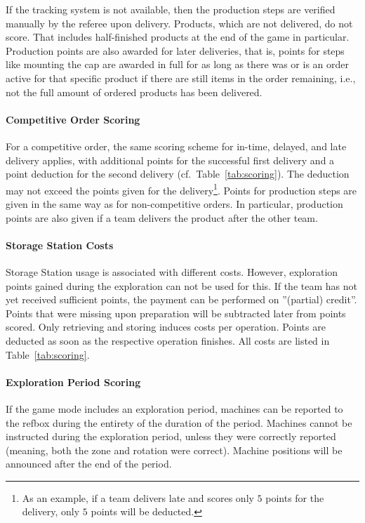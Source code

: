 \documentclass[12pt,twoside]{article}
\newcommand{\reftab}[1]{Table~\ref{#1}}
\begin{document}
If the tracking system is not available, then the production steps are
verified manually by the referee upon delivery.
Products, which are not delivered, do not score. That includes half-finished
products at the end of the game in particular. Production points are
also awarded for later deliveries, that is, points for steps like
mounting the cap are awarded in full for as long as there was or is
an order active for that specific product if there are still items
in the order remaining, i.e., not the full amount of ordered products
has been delivered.
%

\paragraph{Competitive Order Scoring}
For a competitive order, the same scoring scheme for in-time, delayed, and late
delivery applies, with additional points for the successful first delivery and a
point deduction for the second delivery (cf.~\reftab{tab:scoring}). The
deduction may not exceed the points given for the delivery\footnote{As an
example, if a team delivers late and scores only $5$ points for the delivery,
only $5$ points will be deducted.}. Points for production steps are given in the
same way as for non-competitive orders. In particular, production points are
also given if a team delivers the product after the other team.

\paragraph{Storage Station Costs}
Storage Station usage is associated with different costs.
However, exploration points gained during the exploration can not be
used for this. If the team has not yet received sufficient points,
the payment can be performed on ''(partial) credit''. Points that %
were missing upon preparation will be subtracted later from points scored.
Only retrieving and storing induces costs per operation.
Points are deducted as soon as the respective operation finishes.
All costs are listed in \reftab{tab:scoring}.

\paragraph{Exploration Period Scoring}
If the game mode includes an exploration period, machines
can be reported to the \ac{refbox} during the entirety of the duration of the
period.
Machines cannot be instructed during the exploration period, unless they were
correctly reported (meaning, both the zone and rotation were correct).
Machine positions will be announced after the end of the period.
\end{document}
